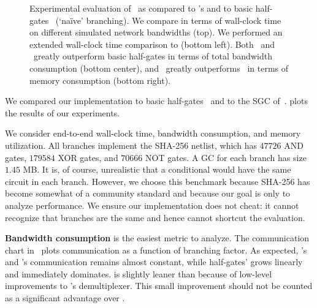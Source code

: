 \begin{figure}[t]
\begin{adjustwidth}{-0.13\textwidth}{-0.13\textwidth}
  \end{adjustwidth}
  \caption{%
    Experimental evaluation of \ourschemelong\ as compared to  \HK's
    \stack and to basic half-gates~\cite{EC:ZahRosEva15} (`na\"ive'
    branching).
    We compare in terms of wall-clock time on different simulated network
    bandwidths (top).
    We performed an extended wall-clock time comparison to \stack
    (bottom left).
    Both \ourschemelong\ and \stack\ greatly outperform basic
    half-gates in terms of total bandwidth consumption (bottom
    center), and \ourschemelong\ greatly outperforms \stack\ in terms
    of memory consumption (bottom right).
  }\label{fig:plots}
\end{figure}

\medskip
We compared our implementation
to basic half-gates~\cite{EC:ZahRosEva15} and to the
\stack SGC of~\HK.
 plots the results of our experiments.

We consider end-to-end wall-clock time, bandwidth consumption, and memory utilization.
All branches implement the SHA-256 netlist, which has $47726$ AND gates,
$179584$ XOR gates, and $70666$ NOT gates.
A GC for each branch has size $1.45$ MB.
It is, of course, unrealistic that a conditional would have the same
circuit in each branch. However, we choose this benchmark because
SHA-256 has become somewhat of a community standard and because our
goal is only to analyze performance.
%
We ensure our implementation does not cheat: it cannot recognize
that branches are the same and hence cannot shortcut the evaluation.

\textbf{Bandwidth consumption}  is the easiest metric to analyze.
The communication chart in~ plots communication
as a function of branching factor.  As expected, \stack's and
\ourschemelong's communication remains almost constant, while half-gates'
grows linearly and immediately dominates.  \ourschemelong is slightly
leaner than \stack because of low-level improvements to
\ourschemelong's demultiplexer. This small improvement should not be counted
as a significant advantage over \stack.

